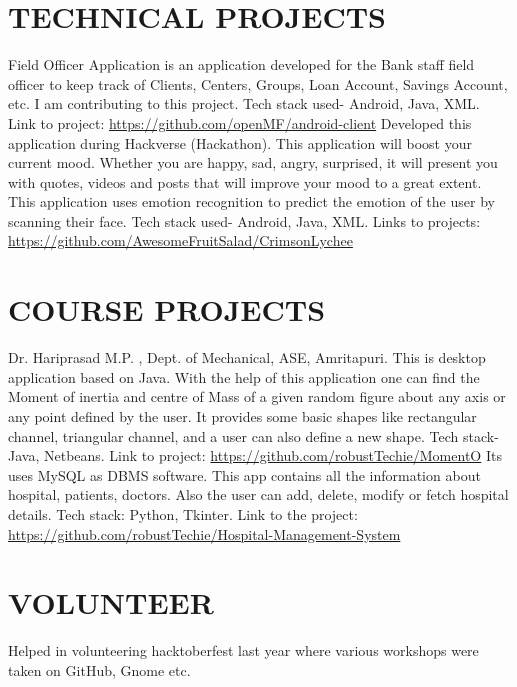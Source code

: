 \documentclass[11pt,a4paper,sans]{moderncv}        %
\begin{document}
\section{TECHNICAL PROJECTS}
{Field Officer Application is an application developed for the Bank staff field officer to keep track of Clients, Centers, Groups, Loan Account, Savings Account, etc. I am contributing to this project. Tech stack used- Android, Java, XML. Link to project:{\newline} 
\url{https://github.com/openMF/android-client}}{}  %
{Developed this application during Hackverse (Hackathon). This application will boost your current mood. Whether you are happy, sad, angry, surprised, it will present you with quotes, videos and posts that will improve your mood to a great extent. This application uses emotion recognition to predict the emotion of the user by scanning their face. Tech stack used- Android, Java, XML. Links to projects:{\newline}
\url{https://github.com/AwesomeFruitSalad/CrimsonLychee}}{}

\section{COURSE PROJECTS}
{Dr. Hariprasad M.P. , Dept. of Mechanical, ASE, Amritapuri.{\newline}
This is desktop application based on Java. With the help of this application one can find the Moment of inertia and centre of Mass of a given random figure about any axis or any point defined by the user. It provides some basic shapes like rectangular channel, triangular channel, and a user can also define a new shape. Tech stack- Java, Netbeans. Link to project:{\newline}
\url{https://github.com/robustTechie/MomentO}}{}
{Its uses MySQL as DBMS software. This app contains all the information about hospital, patients, doctors. Also the user can add, delete, modify or fetch hospital details. Tech stack: Python, Tkinter. Link to the project:  {\newline}
\url{https://github.com/robustTechie/Hospital-Management-System}}{}

\section{VOLUNTEER}
{Helped in volunteering  hacktoberfest last year where various workshops were taken on GitHub, Gnome etc. }
\end{document}
